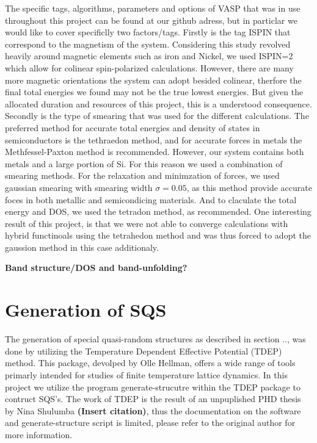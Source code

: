 The specific tags, algorithms, parameters and options of VASP that was in use throughout this project can be found at our github adress, but in particlar we would like to cover specificlly two factors/tags. Firstly is the tag ISPIN that correspond to the magnetism of the system. Considering this study revolved heavily around magnetic elements such as iron and Nickel, we used ISPIN=2 which allow for colinear spin-polarized calculations. However, there are many more magnetic orientations the system can adopt besided colinear, therfore the final total energies we found may not be the true lowest energies. But given the allocated duration and resources of this project, this is a understood consequence. Secondly is the type of smearing that was used for the different calculations. The preferred method for accurate total energies and density of states in semiconductors is the tethraedon method, and for accurate forces in metals the Methfessel-Paxton method is recommended. However, our system contains both metals and a large portion of Si. For this reason we used a combination of smearing methods. For the relaxation and minimzation of forces, we used gaussian smearing with smearing width $\sigma = 0.05$, as this method provide accurate foces in both metallic and semicondicing materials. And to claculate the total energy and DOS, we used the tetradon method, as recommended. One interesting result of this project, is that we were not able to converge calculations with hybrid functinoals using the tetrahedon method and was thus forced to adopt the gaussion method in this case additionaly. 

\textbf{Band structure/DOS and band-unfolding?}

\section{Generation of SQS}
The generation of special quasi-random structures as described in section .., was done by utilizing the Temperature Dependent Effective Potential (TDEP) method. This package, devolped by Olle Hellman, offers a wide range of tools primarly intended for studies of finite temperature lattice dynamics. In this project we utilize the program generate-strucutre within the TDEP package to contruct SQS's. The work of TDEP is the result of an unpuplished PHD thesis by Nina Shulumba \textbf{(Insert citation)}, thus the documentation on the software and generate-structure script is limited, please refer to the original author for more information. 

